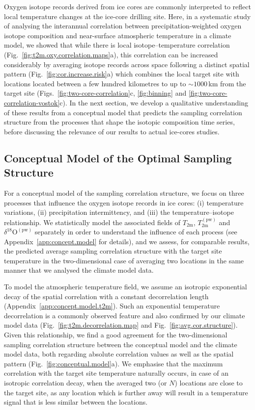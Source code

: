 \documentclass[draft]{agujournal2019}
\begin{document}
Oxygen isotope records derived from ice cores are commonly interpreted to
reflect local temperature changes at the ice-core drilling site. Here, in a
systematic study of analysing the interannual correlation between
precipitation-weighted oxygen isotope composition and near-surface atmospheric
temperature in a climate model, we showed that while there is local
isotope--temperature correlation (Fig.~\ref{fig:t2m.oxy.correlation.maps}a),
this correlation can be increased considerably by averaging isotope records
across space following a distinct spatial pattern
(Fig.~\ref{fig:cor.increase.risk}a) which combines the local target site with
locations located between a few hundred kilometres to up to $\sim1000$\,km from
the target site (Figs.~\ref{fig:two-core-correlation}c, \ref{fig:binning} and
\ref{fig:two-core-correlation-vostok}c). In the next section, we develop a
qualitative understanding of these results from a conceptual model that predicts
the sampling correlation structure from the processes that shape the isotopic
composition time series, before discussing the relevance of our results to
actual ice-cores studies.

\subsection{Conceptual Model of the Optimal Sampling Structure}
\label{discussion:concept.model}

For a conceptual model of the sampling correlation structure, we focus on three
processes that influence the oxygen isotope records in ice cores: (i)
temperature variations, (ii) precipitation intermittency, and (iii) the
temperature--isotope relationship. We statistically model the associated fields
of $T_{\mathrm{2m}}$, $T_{2\mathrm{m}}^{\mathrm{(pw)}}$ and
$\delta^{18}\mathrm{O}^{\mathrm{(pw)}}$ separately in order to understand the
influence of each process (see Appendix~\ref{app:concept.model} for details),
and we assess, for comparable results, the predicted average sampling
correlation structure with the target site temperature in the two-dimensional
case of averaging two locations in the same manner that we analysed the climate
model data.

To model the atmospheric temperature field, we assume an isotropic exponential
decay of the spatial correlation with a constant decorrelation length
(Appendix~\ref{app:concept.model.t2m}). Such an exponential temperature
decorrelation is a commonly observed feature \cite{Jones1997} and also
confirmed by our climate model data (Fig.~\ref{fig:t2m.decorrelation.map} and
Fig.~\ref{fig:avg.cor.structure}). Given this relationship, we find a good
agreement for the two-dimensional sampling correlation structure between the
conceptual model and the climate model data, both regarding absolute correlation
values as well as the spatial pattern (Fig.~\ref{fig:conceptual.model}a). We
emphasise that the maximum correlation with the target site temperature
naturally occurs, in case of an isotropic correlation decay, when the averaged
two (or $N$) locations are close to the target site, as any location which is
further away will result in a temperature signal that is less similar between
the locations.
\end{document}
